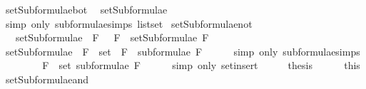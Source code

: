 \begin{isabellebody}
\endisatagproof
{\isafoldproof}%
%
\isadelimproof
\isanewline
%
\endisadelimproof
\isanewline
{}\isamarkupfalse%
\ setSubformulae{\isacharunderscore}bot{\isacharcolon}\isanewline
\ \ {\isachardoublequoteopen}setSubformulae\ {\isacharparenleft}{\isasymbottom}{\isacharparenright}\ {\isacharequal}\ {\isacharbraceleft}{\isasymbottom}{\isacharbraceright}{\isachardoublequoteclose}\isanewline
%
\isadelimproof
\ \ \ \ %
\endisadelimproof
%
\isatagproof
{}\isamarkupfalse%
\ {\isacharparenleft}simp\ only{\isacharcolon}\ subformulae{\isachardot}simps{\isacharparenleft}{}{\isacharparenright}\ list{\isachardot}set{\isacharparenright}%
\endisatagproof
{\isafoldproof}%
%
\isadelimproof
\isanewline
%
\endisadelimproof
\isanewline
{}\isamarkupfalse%
\ setSubformulae{\isacharunderscore}not{\isacharcolon}\isanewline
\ \ \ {\isachardoublequoteopen}setSubformulae\ {\isacharparenleft}\isactrlbold {\isasymnot}\ F{\isacharparenright}\ {\isacharequal}\ {\isacharbraceleft}\isactrlbold {\isasymnot}\ F{\isacharbraceright}\ {\isasymunion}\ setSubformulae\ F{\isachardoublequoteclose}\isanewline
%
\isadelimproof
%
\endisadelimproof
%
\isatagproof
{}\isamarkupfalse%
\ {\isacharminus}\isanewline
\ \ \isamarkupfalse%
\ {\isachardoublequoteopen}setSubformulae\ {\isacharparenleft}\isactrlbold {\isasymnot}\ F{\isacharparenright}\ {\isacharequal}\ set\ {\isacharparenleft}\isactrlbold {\isasymnot}\ F\ {\isacharhash}\ subformulae\ F{\isacharparenright}{\isachardoublequoteclose}\isanewline
\ \ \ \ \isamarkupfalse%
\ {\isacharparenleft}simp\ only{\isacharcolon}\ subformulae{\isachardot}simps{\isacharparenleft}{}{\isacharparenright}{\isacharparenright}\isanewline
\ \ \isamarkupfalse%
\ \isamarkupfalse%
\ {\isachardoublequoteopen}{\isasymdots}\ {\isacharequal}\ {\isacharbraceleft}\isactrlbold {\isasymnot}\ F{\isacharbraceright}\ {\isasymunion}\ set\ {\isacharparenleft}subformulae\ F{\isacharparenright}{\isachardoublequoteclose}\isanewline
\ \ \ \ \isamarkupfalse%
\ {\isacharparenleft}simp\ only{\isacharcolon}\ set{\isacharunderscore}insert{\isacharparenright}\isanewline
\ \ \isamarkupfalse%
\ \isamarkupfalse%
\ {\isacharquery}thesis\isanewline
\ \ \ \ \isamarkupfalse%
\ this\isanewline
{}\isamarkupfalse%
%
\endisatagproof
{\isafoldproof}%
%
\isadelimproof
\isanewline
%
\endisadelimproof
\isanewline
{}\isamarkupfalse%
\ setSubformulae{\isacharunderscore}and{\isacharcolon}\ \isanewline

\end{isabellebody}
